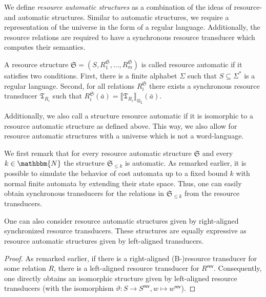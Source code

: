 \documentclass{LMCS}
\newcommand{\nat}{\mathbbm{N}}
\newcommand{\automatonT}{\mathfrak T}
\newcommand{\semantics}[1]{\llbracket#1\rrbracket}
\newcommand{\padprodL}{\otimes_{\mathsf{L}}}
\newcommand{\rev}{\mathsf{rev}}
\newcommand{\structureS}{\mathfrak S}
\begin{document}
We define \emph{resource automatic structures} as a combination of the
ideas of resource- and automatic structures. Similar to automatic structures,
we require a representation of the universe in the form of a regular language.
Additionally, the resource relations are required to have a synchronous
resource transducer which computes their semantics. 

\begin{defi}
A resource structure $\structureS = (S,R_1^\structureS,\ldots,R_m^\structureS)$
is called resource automatic if it satisfies two conditions. First, there is a
finite alphabet $\Sigma$ such that $S \subseteq \Sigma^*$ is a regular language.
Second, for all relations $R_i^\structureS$ there exists a synchronous resource
transducer $\automatonT_{R_i}$ such that $R_i^\structureS(\bar a) =
\semantics{\automatonT_{R_i}}_{\padprodL}(\bar a)$.

Additionally, we also call a structure resource automatic if it is isomorphic to
a resource automatic structure as defined above.
This way, we also allow for resource automatic structures with a universe 
which is not a word-language.
\end{defi}

We first remark that for every resource automatic structure $\structureS$ and
every $k \in \nat$ the structure $\structureS_{\le k}$ is automatic. As
remarked earlier, it is possible to simulate the behavior of cost automata
up to a fixed bound $k$ with normal finite automata by extending their state
space. Thus, one can easily obtain synchronous transducers for the relations in
$\structureS_{\le k}$ from the resource transducers. 


\begin{rem}\label{rem:ResourceAutomaticRightAligned}
	One can also consider resource automatic structures given by right-aligned
	synchronized resource transducers. These structures are equally expressive
	as resource automatic structures given by left-aligned transducers.
\end{rem}
\begin{proof}
	As remarked earlier, if there is a right-aligned (B-)resource transducer for 
	some relation $R$, there is a left-aligned resource transducer for 
	$R^\rev$. Consequently, one directly obtains an isomorphic structure
	given by left-aligned resource transducers (with the isomorphism $\vartheta:
	S \to S^\rev, w \mapsto w^\rev$). 
\end{proof} 
\end{document}

